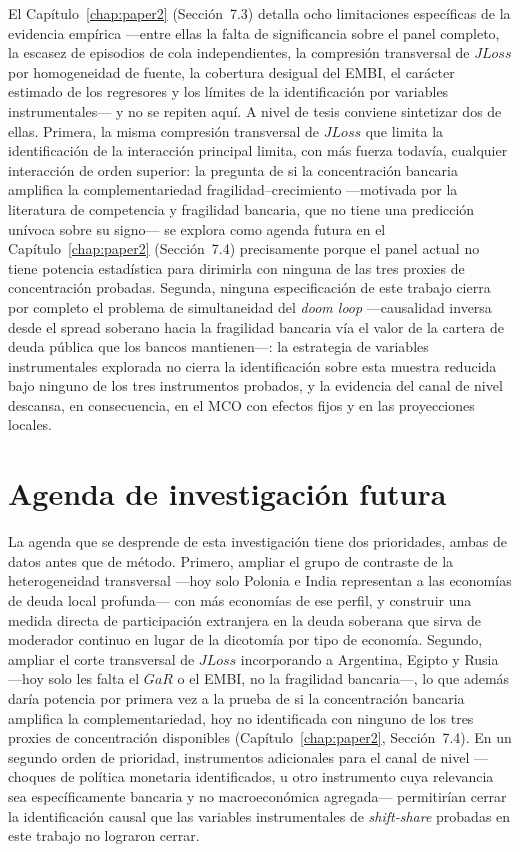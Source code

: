 El Capítulo~\ref{chap:paper2} (Sección~7.3) detalla ocho limitaciones específicas de la evidencia empírica —entre ellas la falta de significancia sobre el panel completo, la escasez de episodios de cola independientes, la compresión transversal de $JLoss$ por homogeneidad de fuente, la cobertura desigual del EMBI, el carácter estimado de los regresores y los límites de la identificación por variables instrumentales— y no se repiten aquí. A nivel de tesis conviene sintetizar dos de ellas. Primera, la misma compresión transversal de $JLoss$ que limita la identificación de la interacción principal limita, con más fuerza todavía, cualquier interacción de orden superior: la pregunta de si la concentración bancaria amplifica la complementariedad fragilidad--crecimiento —motivada por la literatura de competencia y fragilidad bancaria, que no tiene una predicción unívoca sobre su signo— se explora como agenda futura en el Capítulo~\ref{chap:paper2} (Sección~7.4) precisamente porque el panel actual no tiene potencia estadística para dirimirla con ninguna de las tres proxies de concentración probadas. Segunda, ninguna especificación de este trabajo cierra por completo el problema de simultaneidad del \textit{doom loop} —causalidad inversa desde el spread soberano hacia la fragilidad bancaria vía el valor de la cartera de deuda pública que los bancos mantienen—: la estrategia de variables instrumentales explorada no cierra la identificación sobre esta muestra reducida bajo ninguno de los tres instrumentos probados, y la evidencia del canal de nivel descansa, en consecuencia, en el MCO con efectos fijos y en las proyecciones locales.

\section{Agenda de investigación futura}

La agenda que se desprende de esta investigación tiene dos prioridades, ambas de datos antes que de método. Primero, ampliar el grupo de contraste de la heterogeneidad transversal —hoy solo Polonia e India representan a las economías de deuda local profunda— con más economías de ese perfil, y construir una medida directa de participación extranjera en la deuda soberana que sirva de moderador continuo en lugar de la dicotomía por tipo de economía. Segundo, ampliar el corte transversal de $JLoss$ incorporando a Argentina, Egipto y Rusia —hoy solo les falta el $GaR$ o el EMBI, no la fragilidad bancaria—, lo que además daría potencia por primera vez a la prueba de si la concentración bancaria amplifica la complementariedad, hoy no identificada con ninguno de los tres proxies de concentración disponibles (Capítulo~\ref{chap:paper2}, Sección~7.4). En un segundo orden de prioridad, instrumentos adicionales para el canal de nivel —choques de política monetaria identificados, u otro instrumento cuya relevancia sea específicamente bancaria y no macroeconómica agregada— permitirían cerrar la identificación causal que las variables instrumentales de \textit{shift-share} probadas en este trabajo no lograron cerrar.


